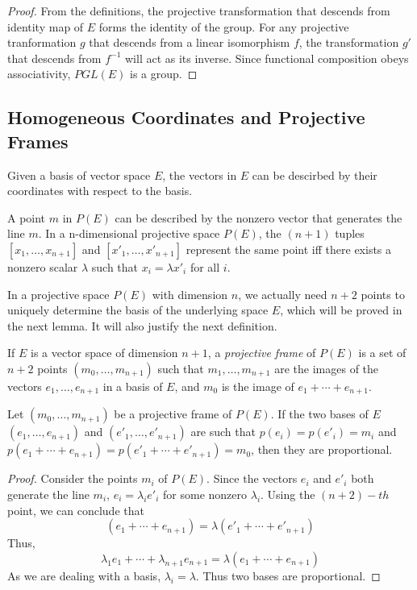 \begin{proof}
  From the definitions, the projective transformation that descends from identity map of $E$
  forms the identity of the group. For any projective tranformation $g$ that descends from a
  linear isomorphism $f$, the transformation $g'$ that descends from $f^{-1}$ will act as its
  inverse. Since functional composition obeys associativity, $PGL(E)$ is a group.
\end{proof}

\subsection{Homogeneous Coordinates and Projective Frames}

Given a basis of vector space $E$, the vectors in $E$ can be descirbed by their coordinates with
respect to the basis. 

\begin{definition}
  A point $m$ in $P(E)$ can be described by the nonzero vector that generates the line $m$. In a
  n-dimensional projective space $P(E)$, the $(n+1)$ tuples $[x_1,\ldots,x_{n+1}]$ and
  $[x'_1,\ldots,x'_{n+1}]$ represent the same point iff there exists a nonzero scalar $\lambda$
  such that $x_i=\lambda x'_i$ for all $i$.
\end{definition}

In a projective space $P(E)$ with dimension $n$, we actually need $n+2$ points to uniquely determine
the basis of the underlying space $E$, which will be proved in the next lemma. It will also
justify the next definition.

\begin{definition}
  If $E$ is a vector space of dimension $n+1$, a \textit{projective frame} of $P(E)$ is a set of
  $n+2$ points  $(m_0,\ldots,m_{n+1})$ such that $m_1,\ldots,m_{n+1}$ are the images of the
  vectors $e_1,\ldots,e_{n+1}$ in a basis of $E$, and $m_0$ is the image of
  $e_1+\cdots+e_{n+1}$.
\end{definition}

\begin{lemma}
  Let $(m_0,\ldots,m_{n+1})$ be a projective frame of $P(E)$. If the two bases of $E$
  $(e_1,\ldots,e_{n+1})$ and $(e'_1,\ldots,e'_{n+1})$ are such that $p(e_i)=p(e'_i)=m_i$ and
  $p(e_1+\cdots+e_{n+1})=p(e'_1+\cdots+e'_{n+1})=m_0$, then they are proportional.
\end{lemma}

\begin{proof}
  Consider the points $m_i$ of $P(E)$. Since the vectors $e_i$ and $e'_i$ both generate the line
  $m_i$, $e_i=\lambda_i e'_i$ for some nonzero $\lambda_i$. Using the $(n+2)-th$ point, we can
  conclude that 
  \[
    (e_1+\cdots+e_{n+1})=\lambda(e'_1+\cdots+e'_{n+1})
  \]
  Thus,
  \[
    \lambda_1e_1+\cdots+\lambda_{n+1}e_{n+1}=\lambda(e_1+\cdots+e_{n+1})
  \]
  As we are dealing with a basis, $\lambda_i=\lambda$. Thus two bases are proportional.
\end{proof}

